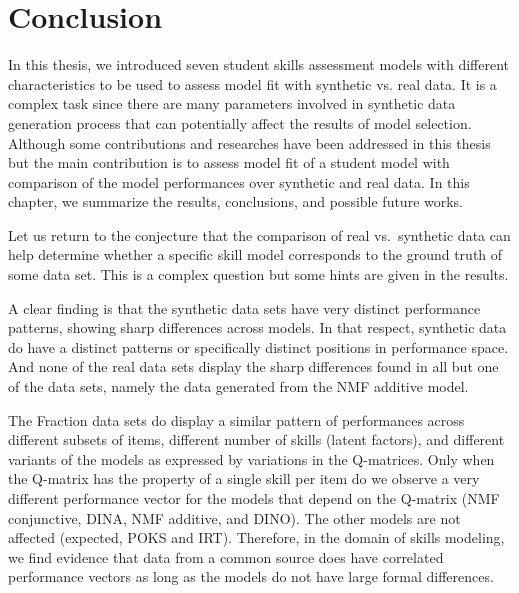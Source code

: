\label{sec:Conclusion}

\section{Conclusion}
In this thesis, we introduced seven student skills assessment models with different characteristics to be used to assess model fit with synthetic vs. real data. It is a complex task since there are many parameters involved in synthetic data generation process that can potentially affect the results of model selection. Although some contributions and researches have been addressed in this thesis but the main contribution is to assess model fit of a student model with comparison of the model performances over synthetic and real data. In this chapter, we summarize the results, conclusions, and possible future works.
%



Let us return to the conjecture that the comparison of real vs.\ synthetic data can help determine whether a specific skill model corresponds to the ground truth of some data set.  This is a complex question but some hints are given in the results.  

A clear finding is that the synthetic data sets have very distinct performance patterns, showing sharp differences across models.  In that respect, synthetic data do have a distinct patterns or specifically distinct positions in performance space.  And none of the real data sets display the sharp differences found in all but one of the data sets, namely the data generated from the NMF additive model.  

The Fraction data sets do display a similar pattern of performances across different subsets of items, different number of skills (latent factors), and different variants of the models as expressed by variations in the Q-matrices. Only when the Q-matrix has the property of a single skill per item do we observe a very different performance vector for the models that depend on the Q-matrix (NMF conjunctive, DINA, NMF additive, and DINO).  The other models are not affected (expected, POKS and IRT).  Therefore, in the domain of skills modeling, we find evidence that data from a common source does have correlated performance vectors as long as the models do not have large formal differences.


